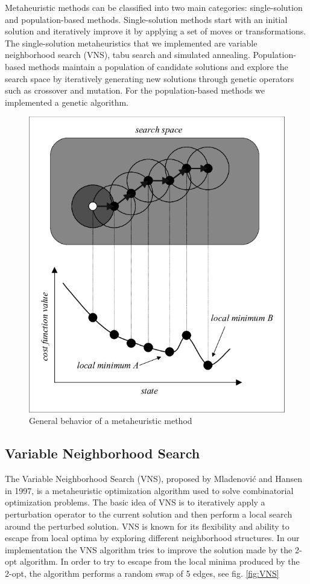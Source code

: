 Metaheuristic methods can be classified into two main categories: single-solution and population-based methods. Single-solution methods start with an initial solution and iteratively improve it by applying a set of moves or transformations. The single-solution metaheuristics that we implemented are variable neighborhood search (VNS), tabu search and simulated annealing. Population-based methods maintain a population of candidate solutions and explore the search space by iteratively generating new solutions through genetic operators such as crossover and mutation. For the population-based methods we implemented a genetic algorithm.

\begin{figure}[!h]
    \centering
    \includegraphics[]{images/metaheuristics.png}
    \caption{General behavior of a metaheuristic method}
    \label{fig:metaheur}
\end{figure}



\subsection{Variable Neighborhood Search}
The Variable Neighborhood Search (VNS), proposed by Mladenović and Hansen in 1997,  is a metaheuristic optimization algorithm used to solve combinatorial optimization problems. The basic idea of VNS is to iteratively apply a perturbation operator to the current solution and then perform a local search around the perturbed solution. VNS is known for its flexibility and ability to escape from local optima by exploring different neighborhood structures.
In our implementation the VNS algorithm tries to improve the solution made by the 2-opt algorithm. In order to try to escape from the local minima produced by the 2-opt, the algorithm performs a random swap of 5 edges, see fig. \ref{fig:VNS} %


